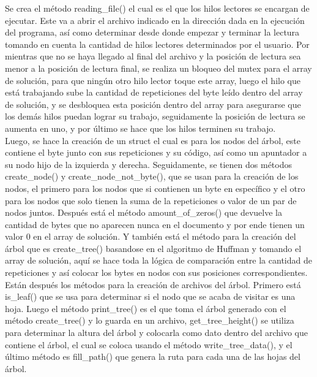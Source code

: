 \documentclass[12pt, article, natbib]{IEEEtran}
\begin{document}
Se crea el método reading\_file() el cual es el que los hilos lectores se encargan de ejecutar. Este va a abrir el archivo indicado en la dirección dada en la ejecución del programa, así como determinar desde donde empezar y terminar la lectura tomando en cuenta la cantidad de hilos lectores determinados por el usuario.\cite{chanilastnam_2015_c} \cite{cppreferencecom_2021_fread} \cite{kerrisk_2010_fseek3} Por mientras que no se haya llegado al final del archivo y la posición de lectura sea menor a la posición de lectura final, se realiza un bloqueo del mutex para el array de solución, para que ningún otro hilo lector toque este array, luego el hilo que está trabajando sube la cantidad de repeticiones del byte leído dentro del array de solución, y se desbloquea esta posición dentro del array para asegurarse que los demás hilos puedan lograr su trabajo, seguidamente la posición de lectura se aumenta en uno, y por último se hace que los hilos terminen su trabajo.\cite{kerrisk_2010_pthread_exit3} \\

Luego, se hace la creación de un struct el cual es para los nodos del árbol, este contiene el byte junto con sus repeticiones y su código, así como un apuntador a su nodo hijo de la izquierda y derecha. Seguidamente, se tienen dos métodos create\_node() y create\_node\_not\_byte(), que se usan para la creación de los nodos, el primero para los nodos que si contienen un byte en específico y el otro para los nodos que solo tienen la suma de la repeticiones o valor de un par de nodos juntos. Después está el método amount\_of\_zeros() que devuelve la cantidad de bytes que no aparecen nunca en el documento y por ende tienen un valor 0 en el array de solución. Y también está el método para la creación del árbol que es create\_tree() basandose en el algoritmo de Huffman y tomando el array de solución, aquí se hace toda la lógica de comparación entre la cantidad de repeticiones y así colocar los bytes en nodos con sus posiciones correspondientes.\\ 

Están después los métodos para la creación de archivos del árbol. Primero está is\_leaf() que se usa para determinar si el nodo que se acaba de visitar es una hoja. Luego el método print\_tree() es el que toma el árbol generado con el método create\_tree() y lo guarda en un archivo, get\_tree\_height() se utiliza para determinar la altura del árbol y colocarla como dato dentro del archivo que contiene el árbol, el cual se coloca usando el método write\_tree\_data(), y el último método es fill\_path() que genera la ruta para cada una de las hojas del árbol.\cite{tutorialspointindiaprivatelimited_c}\cite{sonofblip_2013_append}\cite{dtech_2012_how}\\
\end{document}
